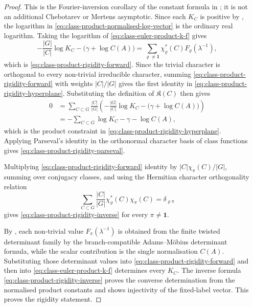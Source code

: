 \documentclass[11pt,a4paper]{amsart}
\theoremstyle{plain}
\theoremstyle{definition}
\theoremstyle{remark}
\begin{document}
\begin{proof}
  This is the Fourier-inversion corollary of the constant formula in
  ; it is not an additional
  Chebotarev or Mertens asymptotic.
  Since each \(K_C\) is positive by
  , the logarithm in
  \eqref{eq:class-product-normalised-log-vector} is the ordinary real
  logarithm.  Taking the logarithm of
  \eqref{eq:class-euler-product-k-f} gives
  \[
    -\frac{|G|}{|C|}\log K_C-\bigl(\gamma+\log C(A)\bigr)
    =
    \sum_{\varrho\neq\mathbf1}
      \chi_\varrho^\ast(C)F_\varrho(\lambda^{-1}),
  \]
  which is \eqref{eq:class-product-rigidity-forward}.  Since the trivial
  character is orthogonal to every non-trivial irreducible character,
  summing \eqref{eq:class-product-rigidity-forward} with weights
  \(|C|/|G|\) gives the first identity in
  \eqref{eq:class-product-rigidity-hyperplane}.  Substituting the
  definition of \(\mathfrak K(C)\) then gives
  \begin{align*}
    0
    &=
    \sum_{C\subset G}\frac{|C|}{|G|}
      \left(-\frac{|G|}{|C|}\log K_C
        -\bigl(\gamma+\log C(A)\bigr)\right) \\
    &=-\sum_{C\subset G}\log K_C-\gamma-\log C(A),
  \end{align*}
  which is the product constraint in
  \eqref{eq:class-product-rigidity-hyperplane}.  Applying Parseval's
  identity in the orthonormal character basis of class functions gives
  \eqref{eq:class-product-rigidity-parseval}.

  Multiplying \eqref{eq:class-product-rigidity-forward}
  identity by \(|C|\chi_\pi(C)/|G|\), summing over conjugacy classes, and
  using the Hermitian character orthogonality relation
  \[
    \sum_{C\subset G}\frac{|C|}{|G|}
      \chi_\varrho^\ast(C)\chi_\pi(C)=\delta_{\varrho\pi}
  \]
  gives \eqref{eq:class-product-rigidity-inverse} for every
  \(\pi\neq\mathbf1\).

  By , each non-trivial value
  \(F_\pi(\lambda^{-1})\) is obtained from the finite twisted determinant
  family by the branch-compatible Adams--M\"obius determinant formula,
  while the scalar contribution is the single normalisation \(C(A)\).
  Substituting those determinant values into
  \eqref{eq:class-product-rigidity-forward} and then into
  \eqref{eq:class-euler-product-k-f} determines every \(K_C\).  The
  inverse formula \eqref{eq:class-product-rigidity-inverse} proves the
  converse determination from the normalised product constants and shows
  injectivity of the fixed-label vector.  This proves the rigidity
  statement.
\end{proof}
\end{document}
